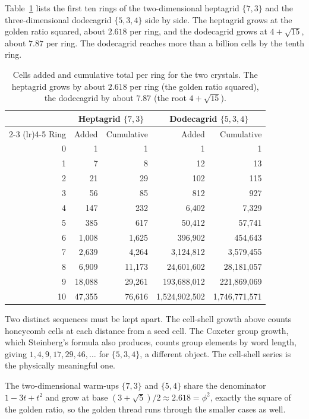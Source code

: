Table~\ref{tab:layers} lists the first ten rings of the two-dimensional heptagrid $\{7,3\}$ and the
three-dimensional dodecagrid $\{5,3,4\}$ side by side. The heptagrid grows at the golden ratio squared,
about $2.618$ per ring, and the dodecagrid grows at $4 + \sqrt{15}$, about $7.87$ per ring. The dodecagrid
reaches more than a billion cells by the tenth ring.

\begin{table}[h]
\centering
\begin{tabular}{rrrrr}
\toprule
 & \multicolumn{2}{c}{Heptagrid $\{7,3\}$} & \multicolumn{2}{c}{Dodecagrid $\{5,3,4\}$} \\
\cmidrule(lr){2-3} \cmidrule(lr){4-5}
Ring & Added & Cumulative & Added & Cumulative \\
\midrule
0 & 1 & 1 & 1 & 1 \\
1 & 7 & 8 & 12 & 13 \\
2 & 21 & 29 & 102 & 115 \\
3 & 56 & 85 & 812 & 927 \\
4 & 147 & 232 & 6{,}402 & 7{,}329 \\
5 & 385 & 617 & 50{,}412 & 57{,}741 \\
6 & 1{,}008 & 1{,}625 & 396{,}902 & 454{,}643 \\
7 & 2{,}639 & 4{,}264 & 3{,}124{,}812 & 3{,}579{,}455 \\
8 & 6{,}909 & 11{,}173 & 24{,}601{,}602 & 28{,}181{,}057 \\
9 & 18{,}088 & 29{,}261 & 193{,}688{,}012 & 221{,}869{,}069 \\
10 & 47{,}355 & 76{,}616 & 1{,}524{,}902{,}502 & 1{,}746{,}771{,}571 \\
\bottomrule
\end{tabular}
\caption{Cells added and cumulative total per ring for the two crystals. The heptagrid grows by about
$2.618$ per ring (the golden ratio squared), the dodecagrid by about $7.87$ (the root $4 + \sqrt{15}$).}
\label{tab:layers}
\end{table}

Two distinct sequences must
be kept apart. The cell-shell growth above counts honeycomb cells at each distance from a seed cell. The
Coxeter group growth, which Steinberg's formula also produces, counts group elements by word length, giving
$1, 4, 9, 17, 29, 46, \dots$ for $\{5,3,4\}$, a different object. The cell-shell series is the physically
meaningful one.

The two-dimensional warm-ups $\{7,3\}$ and $\{5,4\}$ share the denominator $1 - 3t + t^2$ and
grow at base $(3 + \sqrt5)/2 \approx 2.618 = \phi^2$, exactly the square of the golden ratio, so the
golden thread runs through the smaller cases as well.

